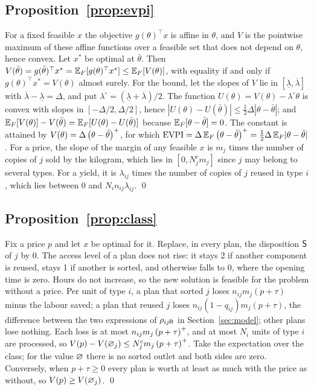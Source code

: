 \subsection*{Proposition~\ref{prop:evpi}}
For a fixed feasible $x$ the objective $g(\theta)^\top x$ is affine in $\theta$, and $V$ is the pointwise maximum of
these affine functions over a feasible set that does not depend on $\theta$, hence convex. Let $x^\ast$ be optimal
at $\bar\theta$. Then $V(\bar\theta)=g(\bar\theta)^\top x^\ast=\mathbb{E}_F[g(\theta)^\top x^\ast]\le\mathbb{E}_F[V(\theta)]$, with
equality if and only if $g(\theta)^\top x^\ast=V(\theta)$ almost surely. For the bound, let the slopes of $V$ lie
in $[\underline\lambda,\overline\lambda]$ with $\overline\lambda-\underline\lambda=\Delta$, and put
$\lambda^\circ=(\underline\lambda+\overline\lambda)/2$. The function $U(\theta)=V(\theta)-\lambda^\circ\theta$ is
convex with slopes in $[-\Delta/2,\Delta/2]$, hence $|U(\theta)-U(\bar\theta)|\le\tfrac12\Delta|\theta-\bar\theta|$;
and $\mathbb{E}_F[V(\theta)]-V(\bar\theta)=\mathbb{E}_F[U(\theta)-U(\bar\theta)]$ because $\mathbb{E}_F[\theta-\bar\theta]=0$. The constant
is attained by $V(\theta)=\Delta\left(\theta-\bar\theta\right)^{+}$, for which $\operatorname{EVPI}=\Delta\,\mathbb{E}_F\left(\theta-\bar\theta\right)^{+}=\tfrac12\Delta\,\mathbb{E}_F|\theta-\bar\theta|$. For a price,
the slope of the margin of any feasible $x$ is $m_j$ times the number of copies of $j$ sold by the kilogram, which
lies in $[0,N^{c}_jm_j]$ since $j$ may belong to several types. For a yield, it is $\lambda_{ij}$ times the number
of copies of $j$ reused in type $i$, which lies between $0$ and $N_in_{ij}\lambda_{ij}$. \qed

\subsection*{Proposition~\ref{prop:class}}
Fix a price $p$ and let $x$ be optimal for it. Replace, in every plan, the disposition $\mathsf{S}$ of $j$ by $0$. The
access level of a plan does not rise: it stays 2 if another component is reused, stays 1 if another is sorted, and
otherwise falls to 0, where the opening time is zero. Hours do not increase, so the new solution is feasible for
the problem without a price. Per unit of type $i$, a plan that sorted $j$ loses $n_{ij}m_j(p+\tau)$ minus the
labour saved; a plan that reused $j$ loses $n_{ij}(1-q_{ij})m_j(p+\tau)$, the difference between the two
expressions of $\rho_{ij\mathsf{R}}$ in Section~\ref{sec:model}; other plans lose nothing. Each loss is at most
$n_{ij}m_j\left(p+\tau\right)^{+}$, and at most $N_i$ units of type $i$ are processed, so
$V(p)-V(\varnothing_j)\le N^{c}_jm_j\left(p+\tau\right)^{+}$. Take the expectation over the class; for the value $\varnothing$ there is no
sorted outlet and both sides are zero. Conversely, when $p+\tau\ge0$ every plan is worth at least as much with the
price as without, so $V(p)\ge V(\varnothing_j)$. \qed

